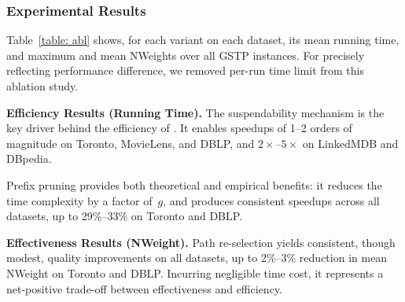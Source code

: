 \subsubsection{Experimental Results}
\label{subsubsec: abl_result}
Table~\ref{table: abl} shows, for each variant on each dataset, its mean running time, and maximum and mean NWeights over all GSTP instances. For precisely reflecting performance difference, we removed per-run time limit from this ablation study.

\textbf{Efficiency Results (Running Time).}
The suspendability mechanism is the key driver behind the efficiency of \ImprovPTS. It enables speedups of 1--2 orders of magnitude on Toronto, MovieLens, and DBLP, and $2\times$--$5\times$ on LinkedMDB and DBpedia. 

Prefix pruning provides both theoretical and empirical benefits: it reduces the time complexity by a factor of~$g$, and produces consistent speedups across all datasets, up to 29\%--33\% on Toronto and DBLP.


\textbf{Effectiveness Results (NWeight).}
Path re-selection yields consistent, though modest, quality improvements on all datasets, up to 2\%--3\% reduction in mean NWeight on Toronto and DBLP. Incurring negligible time cost, it represents a net-positive trade-off between effectiveness and efficiency.



